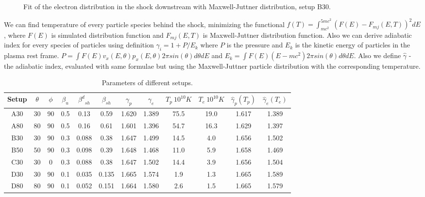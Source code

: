 \documentclass[a4paper]{jpconf}
\begin{document}
\begin{figure}[h!]
\begin{minipage}{0.49\textwidth}
			\caption{Fit of the electron distribution in the shock downstream with Maxwell-Juttner distribution, setup B30.}
			\label{density_turb}
		\end{minipage}
	\end{figure}
We can find temperature of every particle species behind the shock, minimizing the 
functional $\displaystyle f(T) = \int_{m c^{2}}^{5 m c^{2}} (F(E) - F_{mj}(E,T))^{2}dE$, where $\displaystyle F(E)$ is simulated distribution function and $\displaystyle F_{mj}(E,T)$ is Maxwell-Juttner distribution function. Also we can derive adiabatic index for every species of particles using definition $\gamma_i = 1 + P/E_k$ where $P$ is the pressure and  $E_k$ is the kinetic energy of particles in the plasma rest frame. $P = \int F(E) v_x(E,\theta) p_x(E,\theta) 2 \pi sin(\theta) d\theta dE$ and $E_k = \int F(E) (E - m c^2) 2 \pi sin(\theta) d\theta dE$. Also we define $\hat\gamma$ - the adiabatic index, evaluated with same formulae but using the Maxwell-Juttner particle distribution with the corresponding temperature.
	\begin{table}[h!]
	\label{setups}
	\caption{Parameters of different setups. }
	\begin{center}
		\begin{tabular}{|c | c| c| c| c| c| c| c| c| c| c| c|}
			\hline
			Setup & $\theta$ & $\phi$ & ${\beta}_u$ &  ${\beta^d}_{sh}$ & ${\beta}_{sh}$ & ${\gamma}_p$ & ${\gamma}_e$ & $T_p\ 10^{10}K$ & $T_e \ 10^{10}K$ & $\hat{\gamma}_p(T_p)$ & $\hat{\gamma}_e(T_e)$\\
			\hline
			A30 & 30 & 90 & 0.5 &  0.13 & 0.59 & 1.620 & 1.389 &75.5 & 19.0 & 1.617 & 1.389\\
			A80 & 80 & 90 & 0.5 & 0.16 & 0.61 & 1.601 & 1.396 &54.7 & 16.3 & 1.629 & 1.397\\	
			B30  & 30 & 90 & 0.3  & 0.088 & 0.38 & 1.647 & 1.499 & 14.5 & 4.0 & 1.656 & 1.502\\
			B50  & 50 & 90 & 0.3  & 0.098 & 0.39 & 1.648 & 1.468 & 11.0 & 5.9 & 1.658 & 1.469\\
			C30  & 30 & 0 & 0.3  & 0.088 & 0.38 & 1.647 & 1.502 & 14.4 & 3.9 & 1.656 & 1.504\\
			D30 & 30 & 90 & 0.1 &  0.035 & 0.135 & 1.665 & 1.574 &1.9 & 1.3 & 1.665 & 1.589\\
			D80 & 80 & 90 & 0.1 & 0.052 & 0.151 & 1.664 & 1.580 &2.6 & 1.5 & 1.665 & 1.579\\
			\hline
		\end{tabular}
	\end{center}
    \end{table}
    
\end{document}
